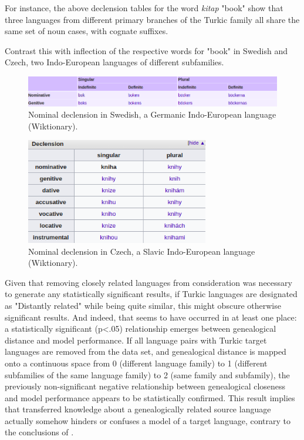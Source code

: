 For instance, the above declension tables for the word \textit{kitap} "book" show that three languages from different primary branches of the Turkic family all share the same set of noun cases, with cognate suffixes.

Contrast this with inflection of the respective words for "book" in Swedish and Czech, two Indo-European languages of different subfamilies.

\begin{figure}[p]
\includegraphics[width=13cm]{images/Swedish_bok.png}
\centering
\caption{Nominal declension in Swedish, a Germanic Indo-European language (Wiktionary).}
\end{figure}

\begin{figure}[p]
\includegraphics[width=8cm]{images/Czech_kniha.png}
\centering
\caption{Nominal declension in Czech, a Slavic Indo-European language (Wiktionary).}
\end{figure}

\newpage

Given that removing closely related languages from consideration was necessary to generate any statistically significant results, if Turkic languages are designated as "Distantly related" while being quite similar, this might obscure otherwise significant results. And indeed, that seems to have occurred in at least one place: a statistically significant (p<.05) relationship emerges between genealogical distance and model performance. If all language pairs with Turkic target languages are removed from the data set, and genealogical distance is mapped onto a continuous space from 0 (different language family) to 1 (different subfamilies of the same language family) to 2 (same family and subfamily), the previously non-significant negative relationship between genealogical closeness and model performance appears to be statistically confirmed. This result implies that transferred knowledge about a genealogically related source language actually somehow hinders or confuses a model of a target language, contrary to the conclusions of \cite{McCarthy2019}.


